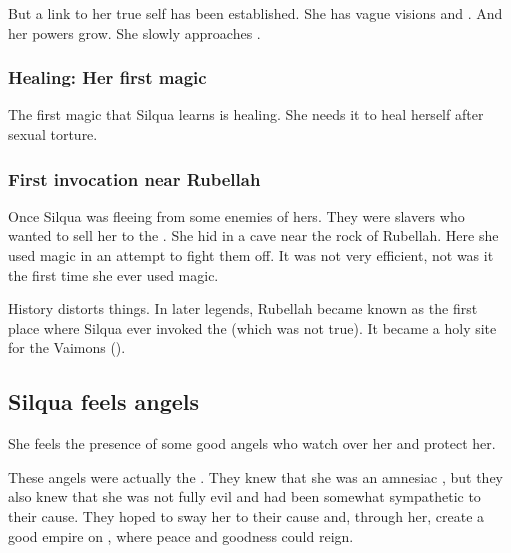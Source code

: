 But a link to her true self has been established. 
She has vague visions and \dejavus. 
And her powers grow. 
She slowly approaches . 





\subsubsection{Healing: Her first magic}
The first magic that Silqua learns is healing. 
She needs it to heal herself after sexual torture. 





\subsubsection{First invocation near Rubellah}
Once Silqua was fleeing from some enemies of hers. 
They were slavers who wanted to sell her to the \Saruns. 
She hid in a cave near the rock of Rubellah.
Here she used magic in an attempt to fight them off.
It was not very efficient, not was it the first time she ever used magic.

History distorts things.  
In later legends, Rubellah became known as the first place where Silqua ever invoked the \sephiroth (which was not true). 
It became a holy site for the Vaimons ().










\subsection{Silqua feels angels}
She feels the presence of some good angels who watch over her and protect her. 


These angels were actually the \Kezeradi. 
They knew that she was an amnesiac \malach, but they also knew that she was not fully evil and had been somewhat sympathetic to their cause. 
They hoped to sway her to their cause and, through her, create a good empire on \Miith{}, where peace and goodness could reign. 

